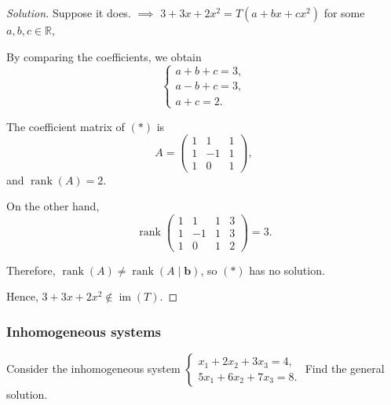 \documentclass[12pt]{article}
\newenvironment{solution}
{\begin{proof}[Solution]}
{\end{proof}}
\begin{document}
\begin{solution}
Suppose it does. $\implies$ $3+3x+2x^2=T(a+bx+cx^2)$ for some $a,b,c\in\mathbb{R}$,

By comparing the coefficients, we obtain
\[
\begin{cases}
a+b+c=3,\\
a-b+c=3,\\
a+c=2.
\end{cases}
\tag{*}
\]

The coefficient matrix of $(*)$ is
\[
A=
\begin{pmatrix}
1 & 1  & 1\\
1 & -1 & 1\\
1 & 0  & 1
\end{pmatrix},
\]
and $\operatorname{rank}(A)=2$.

On the other hand,
\[
\operatorname{rank}
\left(
\begin{array}{ccc|c}
1 & 1  & 1 & 3\\
1 & -1 & 1 & 3\\
1 & 0  & 1 & 2
\end{array}
\right)
=3.
\]

Therefore, $\operatorname{rank}(A)\neq\operatorname{rank}(A\mid\mathbf{b})$, so $(*)$ has no solution.

Hence,
$\boxed{
3+3x+2x^2\notin\operatorname{im}(T)
}.$

\end{solution}

\subsubsection{Inhomogeneous systems}
Consider the inhomogeneous system
$\begin{cases}
x_1+2x_2+3x_3=4,\\
5x_1+6x_2+7x_3=8.
\end{cases}
$ Find the general solution.
\end{document}
